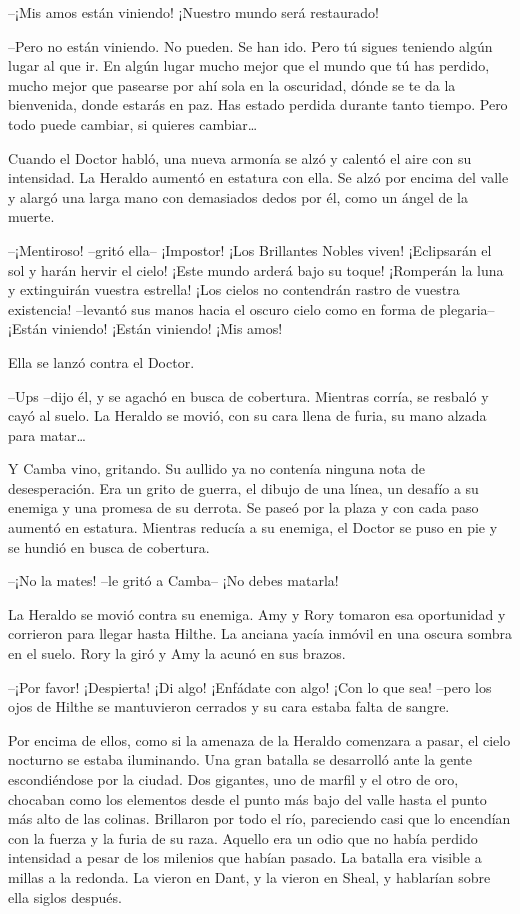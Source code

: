 {--¡Mis amos están viniendo! ¡Nuestro mundo será restaurado!}

{--Pero no están viniendo. No pueden. Se han ido. Pero tú sigues
	teniendo algún lugar al que ir. En algún lugar mucho mejor que el mundo
	que tú has perdido, mucho mejor que pasearse por ahí sola en la
	oscuridad, dónde se te da la bienvenida, donde estarás en paz. Has
	estado perdida durante tanto tiempo. Pero todo puede cambiar, si quieres
	cambiar\ldots{}}

{Cuando el Doctor habló, una nueva armonía se alzó y calentó el aire con
	su intensidad. La Heraldo aumentó en estatura con ella. Se alzó por
	encima del valle y alargó una larga mano con demasiados dedos por él,
como un ángel de la muerte.}

{--¡Mentiroso! --gritó ella-- ¡Impostor! ¡Los Brillantes Nobles viven!
	¡Eclipsarán el sol y harán hervir el cielo! ¡Este mundo arderá bajo su
	toque! ¡Romperán la luna y extinguirán vuestra estrella! ¡Los cielos no
	contendrán rastro de vuestra existencia! --levantó sus manos hacia el
	oscuro cielo como en forma de plegaria-- ¡Están viniendo! ¡Están
viniendo! ¡Mis amos!}

{Ella se lanzó contra el Doctor.}

{--Ups --dijo él, y se agachó en busca de cobertura. Mientras corría,
	se resbaló y cayó al suelo. La Heraldo se movió, con su cara llena de
	furia, su mano alzada para matar\ldots{}}

{Y Camba vino, gritando. Su aullido ya no contenía ninguna nota de
	desesperación. Era un grito de guerra, el dibujo de una línea, un
	desafío a su enemiga y una promesa de su derrota. Se paseó por la plaza
	y con cada paso aumentó en estatura. Mientras reducía a su enemiga, el
Doctor se puso en pie y se hundió en busca de cobertura.}

{--¡No la mates! --le gritó a Camba-- ¡No debes matarla!}

{La Heraldo se movió contra su enemiga. Amy y Rory tomaron esa
	oportunidad y corrieron para llegar hasta Hilthe. La anciana yacía
	inmóvil en una oscura sombra en el suelo. Rory la giró y Amy la acunó en
sus brazos.}

{--¡Por favor! ¡Despierta! ¡Di algo! ¡Enfádate con algo! ¡Con lo que
	sea! --pero los ojos de Hilthe se mantuvieron cerrados y su cara estaba
falta de sangre.}

{Por encima de ellos, como si la amenaza de la Heraldo comenzara a
	pasar, el cielo nocturno se estaba iluminando. Una gran batalla se
	desarrolló ante la gente escondiéndose por la ciudad. Dos gigantes, uno
	de marfil y el otro de oro, chocaban como los elementos desde el punto
	más bajo del valle hasta el punto más alto de las colinas. Brillaron por
	todo el río, pareciendo casi que lo encendían con la fuerza y la furia
	de su raza. Aquello era un odio que no había perdido intensidad a pesar
	de los milenios que habían pasado. La batalla era visible a millas a la
	redonda. La vieron en Dant, y la vieron en Sheal, y hablarían sobre ella
siglos después.}

